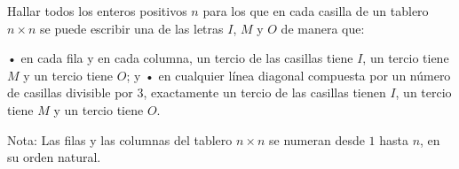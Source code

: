 Hallar todos los enteros positivos $n$ para los que en cada casilla de un tablero $n \times n$ se puede escribir una de las letras $I$, $M$ y $O$ de manera que: \newline 

 •  en cada fila y en cada columna, un tercio de las casillas tiene $I$, un tercio tiene $M$ y un tercio tiene $O$; y \newline 
 • en cualquier línea diagonal compuesta por un número de casillas divisible por $3$, exactamente un tercio de las casillas tienen $I$, un tercio tiene $M$ y un tercio tiene $O$. \newline 

Nota: Las filas y las columnas del tablero $n \times n$ se numeran desde $1$ hasta $n$, en su orden natural. 